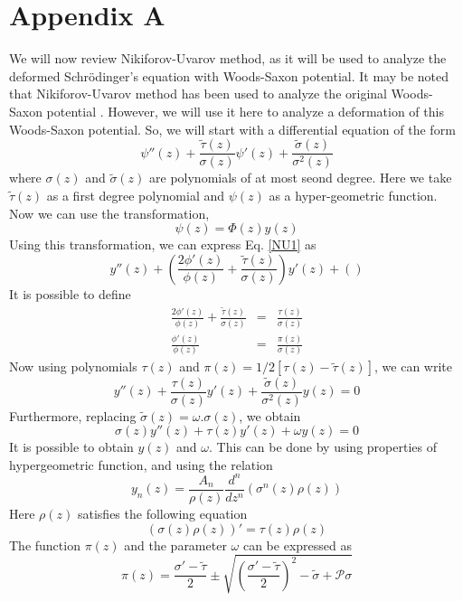 \documentclass[12pt]{article}
\begin{document}
\section*{Appendix A}
We will now review Nikiforov-Uvarov method, as it will be used to analyze the deformed 
  Schr\"{o}dinger's equation   with Woods-Saxon  potential.  It may be noted that  Nikiforov-Uvarov method has been used to analyze the original  Woods-Saxon  potential \cite{nu12, nu14}.
  However, we will use it here to analyze a deformation of this  Woods-Saxon  potential.
 So, we  will start with a differential equation of the form 
\begin{equation} \label{NU1}
	\psi''(z) + \frac{\tilde{\tau}(z)}{\sigma(z)} \psi'(z) + \frac{\tilde{\sigma}(z)}{\sigma^2(z)}
\end{equation}
where  $\sigma(z)$ and $\tilde{\sigma}(z)$ are polynomials of at most seond degree. Here we take  $\tilde{\tau}(z)$ as  a first degree polynomial and $\psi(z)$ as  a hyper-geometric function. Now we can  use the transformation,
\begin{equation} \label{NU2}
	\psi(z ) = \Phi(z) y(z)
\end{equation}    
Using this transformation,  we can express Eq. \eqref{NU1} as 
\begin{equation} \label{NU3}
	y''(z) + \left(\frac{ 2\phi'(z)}{\phi(z)} + \frac{\tilde{\tau}(z)}{\sigma(z)} \right) y'(z) + \left( \right)
\end{equation} 
It is possible to define
\begin{eqnarray} \label{NU4}
	\frac{ 2\phi'(z)}{\phi(z)} + \frac{\tilde{\tau}(z)}{\sigma(z)} &=& \frac{\tau(z)}{\sigma(z)}
\\ 
\label{NU5}
	\frac{\phi'(z)}{\phi(z)} &=& \frac{\pi(z)}{\sigma(z)}
\end{eqnarray} 
Now using  polynomials $\tau(z)$ and $\pi(z) = 1/2 [\tau(z) - \tilde{\tau}(z)]$, we can write 
\begin{equation} \label{NU6}
	y''(z) + \frac{\tau(z)}{\sigma(z)} y'(z) + \frac{\tilde{\sigma}(z)}{\sigma^2 (z)} y(z) = 0
\end{equation}
Furthermore,  replacing $\tilde{\sigma}(z) = \omega. \sigma(z)$,  we obtain 
\begin{equation} \label{NU7}
	\sigma(z) y''(z) + \tau(z) y'(z)  + \omega y(z) = 0
\end{equation}
It is possible to obtain  $y(z)$ and $\omega$. This can be done by  using properties of hypergeometric function, and using the relation
\begin{equation} \label{y_rodriguez}
	 y_n (z) = \frac{A_n}{\rho(z)} \frac{d^n}{dz^n} \left(\sigma^n(z) \rho(z)\right)
\end{equation}
Here  $\rho(z)$ satisfies the following equation \begin{equation}
	(\sigma(z)\rho(z))'  =\tau(z) \rho(z)
\end{equation}
The function $\pi(z)$ and the parameter $\omega$ can be expressed as 
\begin{equation} 
\pi(z) = \frac{\sigma'-\tilde{\tau}}{2} \pm \sqrt{\left(\frac{\sigma'-\tilde{\tau}}{2}\right)^2 - \tilde{\sigma} + \mathcal{P} \sigma}
\end{equation}
\end{document}

